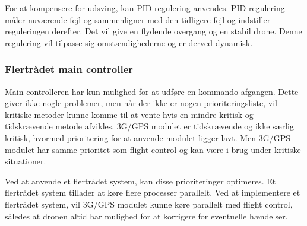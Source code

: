 For at kompensere for udsving, kan PID regulering anvendes. PID regulering måler nuværende fejl og sammenligner med den tidligere fejl og indstiller reguleringen derefter. Det vil give en flydende overgang og en stabil drone. Denne regulering vil tilpasse sig omstændighederne og er derved dynamisk.

\subsubsection*{Flertrådet main controller}

Main controlleren har kun mulighed for at udføre en kommando afgangen. Dette giver ikke nogle problemer, men når der ikke er nogen prioriteringsliste, vil kritiske metoder kunne komme til at vente hvis en mindre kritisk og tidskrævende metode afvikles. 
3G/GPS modulet er tidskrævende og ikke særlig kritisk, hvormed prioritering for at anvende modulet ligger lavt. Men 3G/GPS modulet har samme prioritet som flight control og kan være i brug under kritiske situationer. 

Ved at anvende et flertrådet system, kan disse prioriteringer optimeres. Et flertrådet system tillader at køre flere processer parallelt. Ved at implementere et flertrådet system, vil 3G/GPS modulet kunne køre parallelt med flight control, således at dronen altid har mulighed for at korrigere for eventuelle hændelser. 


